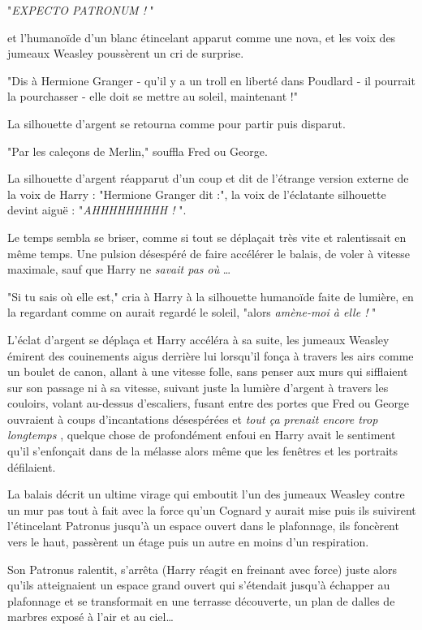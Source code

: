 "\emph{EXPECTO PATRONUM !} "

et l'humanoïde d'un blanc étincelant apparut comme une nova, et les voix des jumeaux Weasley poussèrent un cri de surprise.

"Dis à Hermione Granger - qu'il y a un troll en liberté dans Poudlard - il pourrait la pourchasser - elle doit se mettre au soleil, maintenant !"

La silhouette d'argent se retourna comme pour partir puis disparut.

"Par les caleçons de Merlin," souffla Fred ou George.

La silhouette d'argent réapparut d'un coup et dit de l'étrange version externe de la voix de Harry : "Hermione Granger dit :", la voix de l'éclatante silhouette devint aiguë : "\emph{AHHHHHHHHH !} ".

Le temps sembla se briser, comme si tout se déplaçait très vite et ralentissait en même temps. Une pulsion désespéré de faire accélérer le balais, de voler à vitesse maximale, sauf que Harry ne \emph{savait pas où} …

"Si tu sais où elle est," cria à Harry à la silhouette humanoïde faite de lumière, en la regardant comme on aurait regardé le soleil, "alors \emph{amène-moi à elle !} "

L'éclat d'argent se déplaça et Harry accéléra à sa suite, les jumeaux Weasley émirent des couinements aigus derrière lui lorsqu'il fonça à travers les airs comme un boulet de canon, allant à une vitesse folle, sans penser aux murs qui sifflaient sur son passage ni à sa vitesse, suivant juste la lumière d'argent à travers les couloirs, volant au-dessus d'escaliers, fusant entre des portes que Fred ou George ouvraient à coups d'incantations désespérées et \emph{tout ça prenait encore trop longtemps} , quelque chose de profondément enfoui en Harry avait le sentiment qu'il s'enfonçait dans de la mélasse alors même que les fenêtres et les portraits défilaient.

La balais décrit un ultime virage qui emboutit l'un des jumeaux Weasley contre un mur pas tout à fait avec la force qu'un Cognard y aurait mise puis ils suivirent l'étincelant Patronus jusqu'à un espace ouvert dans le plafonnage, ils foncèrent vers le haut, passèrent un étage puis un autre en moins d'un respiration.

Son Patronus ralentit, s'arrêta (Harry réagit en freinant avec force) juste alors qu'ils atteignaient un espace grand ouvert qui s'étendait jusqu'à échapper au plafonnage et se transformait en une terrasse découverte, un plan de dalles de marbres exposé à l'air et au ciel…

